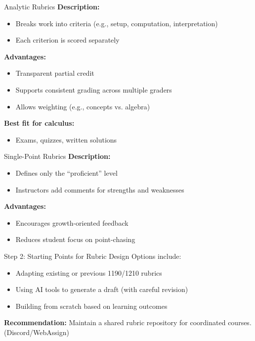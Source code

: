 \documentclass{beamer}
\begin{document}
\begin{frame}{Analytic Rubrics}
\textbf{Description:}
\begin{itemize}
    \item Breaks work into criteria (e.g., setup, computation, interpretation)
    \item Each criterion is scored separately
\end{itemize}

\textbf{Advantages:}
\begin{itemize}
    \item Transparent partial credit
    \item Supports consistent grading across multiple graders
    \item Allows weighting (e.g., concepts vs. algebra)
\end{itemize}

\textbf{Best fit for calculus:}
\begin{itemize}
    \item Exams, quizzes, written solutions
\end{itemize}
\end{frame}

\begin{frame}{Single-Point Rubrics}
\textbf{Description:}
\begin{itemize}
    \item Defines only the ``proficient'' level
    \item Instructors add comments for strengths and weaknesses
\end{itemize}

\textbf{Advantages:}
\begin{itemize}
    \item Encourages growth-oriented feedback
    \item Reduces student focus on point-chasing
\end{itemize}

\end{frame}

\begin{frame}{Step 2: Starting Points for Rubric Design}
Options include:
\begin{itemize}
    \item Adapting existing or previous 1190/1210 rubrics
    \item Using AI tools to generate a draft (with careful revision)
    \item Building from scratch based on learning outcomes
\end{itemize}

\vspace{0.3cm}
\textbf{Recommendation:}
Maintain a shared rubric repository for coordinated courses. (Discord/WebAssign)
\end{frame}
\end{document}
